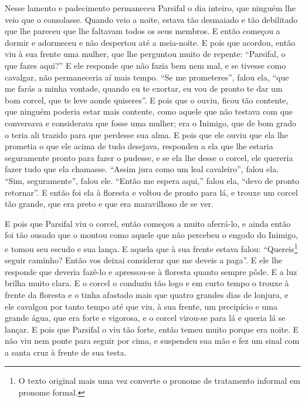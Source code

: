 Nesse lamento e padecimento permaneceu Parsifal o dia inteiro, que ninguém
lhe veio que o consolasse. Quando veio a noite, estava tão desmaiado e tão
debilitado que lhe pareceu que lhe faltavam todos os seus membros. E então
começou a dormir e adormeceu e não despertou até a meia-noite. E pois que
acordou, então viu à sua frente uma mulher, que lhe perguntou muito de repente:
“Parsifal, o que fazes aqui?” E ele responde que não fazia bem nem mal, e se
tivesse como cavalgar, não permaneceria aí mais tempo. “Se me prometeres”,
falou ela, “que me farás a minha vontade, quando eu te exortar, eu vou de
pronto te dar um bom corcel, que te leve aonde quiseres”. E pois que o ouviu,
ficou tão contente, que ninguém poderia estar mais contente, como aquele que
não testava com que conversava e considerava que fosse uma mulher; era o
Inimigo, que de bom grado o teria ali trazido para que perdesse sua alma. E
pois que ele ouviu que ela lhe prometia o que ele acima de tudo desejava,
respondeu a ela que lhe estaria seguramente pronto para fazer o pudesse, e se
ela lhe desse o corcel, ele quereria fazer tudo que ela chamasse. “Assim jura
como um leal cavaleiro”, falou ela. “Sim, seguramente”, falou ele. “Então me
espera aqui,” falou ela, “devo de pronto retornar”. E então foi ela à floresta
e voltou de pronto para lá, e trouxe um corcel tão grande, que era preto e que
era maravilhoso de se ver.

E pois que Parsifal viu o corcel, então começou a muito aferrá-lo, e ainda
então foi tão ousado que o montou como aquele que não percebeu o engodo do
Inimigo, e tomou seu escudo e sua lança. E aquela que à sua frente estava
falou: “Quereis\footnote{ O texto original mais uma vez converte o pronome de
tratamento informal em pronome formal.}  seguir caminho? Então vos
deixai considerar que me deveis a paga”. E ele lhe responde que deveria
fazê-lo e apressou-se à floresta quanto sempre pôde. E a luz brilha muito
clara. E o corcel o conduziu tão logo e em curto tempo o trouxe à frente da
floresta e o tinha afastado mais que quatro grandes dias de lonjura, e ele
cavalgou por tanto tempo até que viu, à sua frente, um precipício e uma grande
água, que era forte e vigorosa, e o corcel virou-se para lá e queria lá se
lançar. E pois que Parsifal o viu tão forte, então temeu muito porque era
noite. E não viu nem ponte para seguir por cima, e suspendeu sua mão e fez um
sinal com a santa cruz à frente de sua testa.

